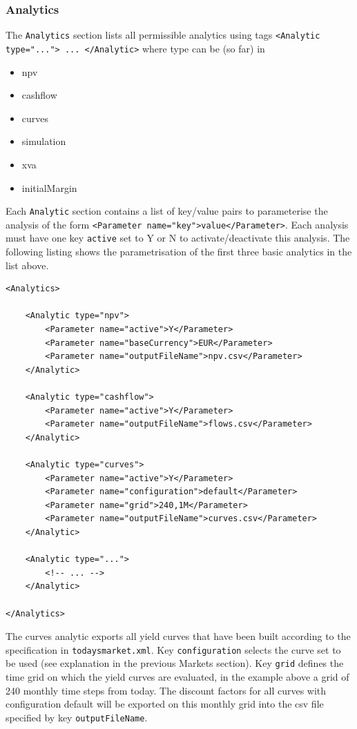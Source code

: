 \documentclass[12pt, a4paper]{article}
\begin{document}
\subsubsection*{Analytics}

The {\tt Analytics} section lists all permissible analytics using tags {\tt <Analytic type="..."> ... </Analytic>} where type can be (so far) in
\begin{itemize}
\item npv
\item cashflow
\item curves
\item simulation
\item xva
\item initialMargin
\end{itemize}

Each {\tt Analytic} section contains a list of key/value pairs to parameterise the analysis of the form {\tt <Parameter name="key">value</Parameter>}. Each analysis
must have one key {\tt active} set to Y or N to activate/deactivate this analysis. 
The following listing shows the parametrisation of the first three basic analytics in the list above.

\begin{lstlisting}[caption={ORE analytics: npv, cashflow and curves},
 	label=lst:ore_analytics]
<Analytics>
    
	<Analytic type="npv">
		<Parameter name="active">Y</Parameter>
		<Parameter name="baseCurrency">EUR</Parameter>
		<Parameter name="outputFileName">npv.csv</Parameter>
	</Analytic>      

	<Analytic type="cashflow">
		<Parameter name="active">Y</Parameter>
		<Parameter name="outputFileName">flows.csv</Parameter>
	</Analytic>      

	<Analytic type="curves">
		<Parameter name="active">Y</Parameter>
		<Parameter name="configuration">default</Parameter>
		<Parameter name="grid">240,1M</Parameter>
		<Parameter name="outputFileName">curves.csv</Parameter>
	</Analytic>      

	<Analytic type="...">
		<!-- ... -->
	</Analytic>      

</Analytics>      
\end{lstlisting}

The curves analytic exports all yield curves that have been built according to the specification in {\tt todaysmarket.xml}. Key {\tt configuration} selects the curve set to be used (see explanation in the previous Markets section).  Key {\tt grid} defines the time grid on which the yield curves are evaluated, in the example above a grid of 240 monthly time steps from today. The discount factors for all curves with configuration default will be exported on this monthly grid into the csv file specified by key {\tt outputFileName}.
\end{document}
